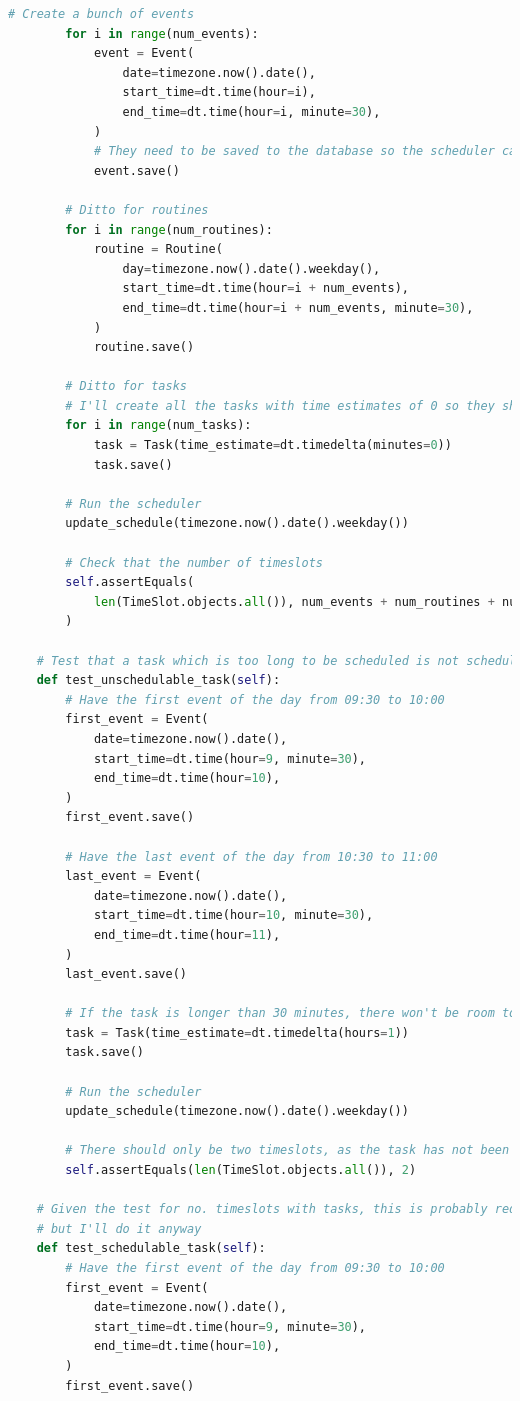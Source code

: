 \documentclass{article}
\begin{document}
\begin{lstlisting}[language=Python]
        # Create a bunch of events
        for i in range(num_events):
            event = Event(
                date=timezone.now().date(),
                start_time=dt.time(hour=i),
                end_time=dt.time(hour=i, minute=30),
            )
            # They need to be saved to the database so the scheduler can see them
            event.save()

        # Ditto for routines
        for i in range(num_routines):
            routine = Routine(
                day=timezone.now().date().weekday(),
                start_time=dt.time(hour=i + num_events),
                end_time=dt.time(hour=i + num_events, minute=30),
            )
            routine.save()

        # Ditto for tasks
        # I'll create all the tasks with time estimates of 0 so they should definitely be scheduled.
        for i in range(num_tasks):
            task = Task(time_estimate=dt.timedelta(minutes=0))
            task.save()

        # Run the scheduler
        update_schedule(timezone.now().date().weekday())

        # Check that the number of timeslots
        self.assertEquals(
            len(TimeSlot.objects.all()), num_events + num_routines + num_tasks
        )

    # Test that a task which is too long to be scheduled is not scheduled
    def test_unschedulable_task(self):
        # Have the first event of the day from 09:30 to 10:00
        first_event = Event(
            date=timezone.now().date(),
            start_time=dt.time(hour=9, minute=30),
            end_time=dt.time(hour=10),
        )
        first_event.save()

        # Have the last event of the day from 10:30 to 11:00
        last_event = Event(
            date=timezone.now().date(),
            start_time=dt.time(hour=10, minute=30),
            end_time=dt.time(hour=11),
        )
        last_event.save()

        # If the task is longer than 30 minutes, there won't be room to schedule it
        task = Task(time_estimate=dt.timedelta(hours=1))
        task.save()

        # Run the scheduler
        update_schedule(timezone.now().date().weekday())

        # There should only be two timeslots, as the task has not been scheduled
        self.assertEquals(len(TimeSlot.objects.all()), 2)

    # Given the test for no. timeslots with tasks, this is probably redundant,
    # but I'll do it anyway
    def test_schedulable_task(self):
        # Have the first event of the day from 09:30 to 10:00
        first_event = Event(
            date=timezone.now().date(),
            start_time=dt.time(hour=9, minute=30),
            end_time=dt.time(hour=10),
        )
        first_event.save()


\end{lstlisting}
\end{document}
